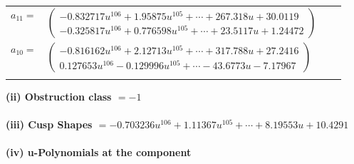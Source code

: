 \documentclass[1p]{elsarticle_modified}
\theoremstyle{definition}
\begin{document}
\begin{tabular}{m{7pt} m{180pt} m{7pt} m{180pt} }
\flushright $a_{11}=$&$\begin{pmatrix}-0.832717 u^{106}+1.95875 u^{105}+\cdots+267.318 u+30.0119\\-0.325817 u^{106}+0.776598 u^{105}+\cdots+23.5117 u+1.24472\end{pmatrix}$ \\
\flushright $a_{10}=$&$\begin{pmatrix}-0.816162 u^{106}+2.12713 u^{105}+\cdots+317.788 u+27.2416\\0.127653 u^{106}-0.129996 u^{105}+\cdots-43.6773 u-7.17967\end{pmatrix}$\\&\end{tabular}
\flushleft \textbf{(ii) Obstruction class $= -1$}\\~\\
\flushleft \textbf{(iii) Cusp Shapes $= -0.703236 u^{106}+1.11367 u^{105}+\cdots+8.19553 u+10.4291$}\\~\\
\newpage\renewcommand{\arraystretch}{1}
\flushleft \textbf{(iv) u-Polynomials at the component}\newline \\
\end{document}
